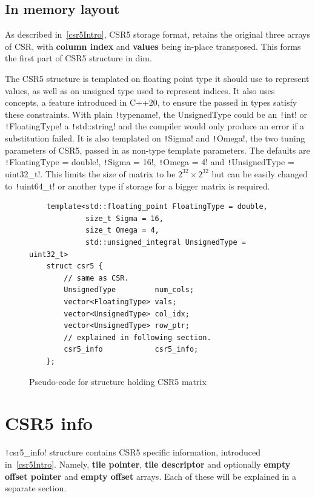 \documentclass[thesis=M,english]{FITthesis}[2019/12/23]
\newcommand{\csre}[1]{\texttt!#1!}
\begin{document}
\subsection{In memory layout}

As described in~\ref{csr5Intro}, CSR5 storage format, retains the original three arrays of CSR, with
\textbf{column index} and \textbf{values} being in-place transposed. This forms the first part of
CSR5 structure in dim.

The CSR5 structure is templated on floating point type it should use to represent values,
as well as on unsigned type used to represent indices. It also uses concepts, a feature introduced in
C++20, to ensure the passed in types satisfy these constraints. With plain \csre{typename},
the UnsignedType could be an \csre{int} or \csre{FloatingType} a \csre{std::string} and the compiler
would only produce an error if a substitution failed. It is also templated on \csre{Sigma} and \csre{Omega},
the two tuning parameters of CSR5, passed in as non-type template parameters. The defaults are
\csre{FloatingType = double}, \csre{Sigma = 16}, \csre{Omega = 4} and \csre{UnsignedType = uint32_t}.
This limits the size of matrix to be \(2^{32}\times2^{32}\) but can be easily changed to \csre{uint64_t} or
another type if storage for a bigger matrix is required.

\begin{figure}[htp]
    \begin{verbatim}
    template<std::floating_point FloatingType = double,
             size_t Sigma = 16,
             size_t Omega = 4,
             std::unsigned_integral UnsignedType = uint32_t>
    struct csr5 {
        // same as CSR.
        UnsignedType         num_cols;
        vector<FloatingType> vals;
        vector<UnsignedType> col_idx;
        vector<UnsignedType> row_ptr;
        // explained in following section.
        csr5_info            csr5_info;
    };
    \end{verbatim}
    \caption{Pseudo-code for structure holding CSR5 matrix}
\end{figure}

\vfil
\pagebreak

\section{CSR5 info}

\csre{csr5_info} structure contains CSR5 specific information, introduced in~\ref{csr5Intro}.
Namely, \textbf{tile pointer}, \textbf{tile descriptor} and optionally \textbf{empty offset pointer} and
\textbf{empty offset} arrays. Each of these will be explained in a separate section.
\end{document}
